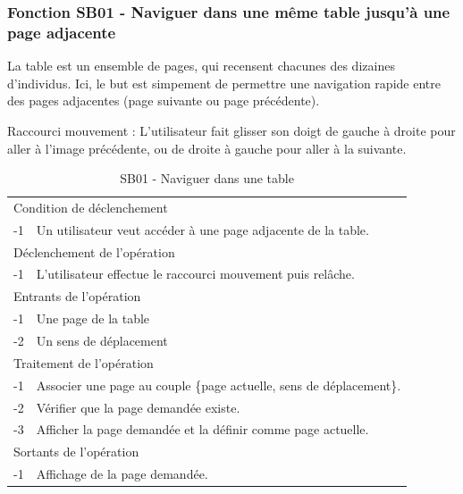 \documentclass[a4paper]{article}
\begin{document}
\subsubsection{Fonction SB01 - Naviguer dans une m\^eme table jusqu'à une page adjacente}

La table est un ensemble de pages, qui recensent chacunes des dizaines d'individus. Ici, le but est simpement de permettre une navigation rapide entre des pages adjacentes (page suivante ou page pr\'ec\'edente).

Raccourci mouvement : L'utilisateur fait glisser son doigt de gauche \`a droite pour aller \`a l'image pr\'ec\'edente, ou de droite \`a gauche pour aller \`a la suivante.

\begin{table}[H]
  \centering
   \small
	\begin{tabular}{|c|p{12cm}|}
   		\hline
   			\rowcolor{lightgray}\multicolumn{2}{|c|}{\textbf{SB01 - Naviguer dans une m\^eme table jusqu'à une page adjacente}} \\
   		\hline
   			\multicolumn{2}{|l|}{Condition de d\'eclenchement} \\
   		\hline
   		-1 & Un utilisateur veut acc\'eder \`a une page adjacente de la table. \\
   		\hline
   			\multicolumn{2}{|l|}{D\'eclenchement de l'op\'eration} \\
   		\hline
   			-1 & L'utilisateur effectue le raccourci mouvement puis rel\^ache. \\
   		\hline
   			\multicolumn{2}{|l|}{Entrants de l'op\'eration} \\
   		\hline
   			-1 & Une page de la table \\
        	-2 & Un sens de d\'eplacement \\ 
   		\hline
   			\multicolumn{2}{|l|}{Traitement de l'op\'eration} \\
  		\hline
   			-1 & Associer une page au couple \{page actuelle, sens de d\'eplacement\}.  \\
        	-2 & V\'erifier que la page demand\'ee existe. \\
        	-3 & Afficher la page demand\'ee et la d\'efinir comme page actuelle. \\
   		\hline
   			\multicolumn{2}{|l|}{Sortants de l'op\'eration} \\
   		\hline
   			-1 & Affichage de la page demand\'ee. \\
   		\hline
	\end{tabular}
  \caption{SB01 - Naviguer dans une table}
  \normalsize
  \label{tab:naviguer_table_unique_adjacent}
\end{table}
\end{document}
